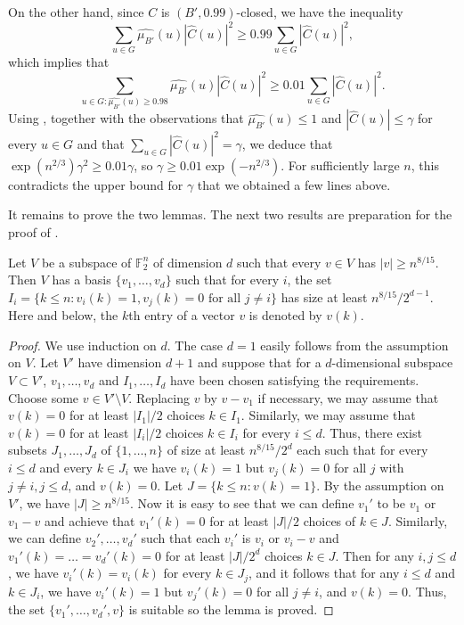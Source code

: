 \documentclass{toc}
\newcommand\g{\gamma}
\newcommand \hC {{\hat C}}
\begin{document}
On the other hand, since $C$ is $(B',0.99)$-closed, we have the inequality
\[\sum_{u\in G} \widehat{\mu_{B'}}(u)|\hC(u)|^2\geq 0.99\sum_{u\in G}|\hC(u)|^2,\]
which implies that 
\[\sum_{u\in G: \widehat{\mu_{B'}}(u)\geq 0.98} \widehat{\mu_{B'}}(u)|\hC(u)|^2\geq 0.01\sum_{u\in G}|\hC(u)|^2.\]
Using , together with the observations that $\widehat{\mu_{B'}}(u)\leq 1$ and $|\hC(u)|\leq \g$ for every $u\in G$ and that $\sum_{u\in G}|\hC(u)|^2=\g$, we deduce that $\exp(n^{2/3})\g^2\geq 0.01 \g$, so $\g\geq 0.01\exp(-n^{2/3})$. For sufficiently large $n$, this contradicts the upper bound for $\g$ that we obtained a few lines above. 
\medskip

It remains to prove the two lemmas. The next two results are preparation for the proof of .

\begin{lemma}\label{Claim2} Let $V$ be a subspace of $\mathbb{F}_2^n$ of dimension $d$ such that every $v\in V$ has $|v|\geq n^{8/15}$. Then $V$ has a basis $\{v_1,\dots,v_d\}$ such that for every $i$, the set $I_i=\{k\leq n: v_i(k)=1,v_j(k)=0 \text{ for all } j\neq i\}$ has size at least $n^{8/15}/2^{d-1}$. Here and below, the $k$th entry of a vector $v$ is denoted by $v(k)$.
\end{lemma}

\begin{proof} We use induction on $d$. The case $d=1$ easily follows from the assumption on $V$. Let $V'$ have dimension $d+1$ and suppose that for a $d$-dimensional subspace $V\subset V'$, $v_1,\dots,v_d$ and $I_1,\dots,I_d$ have been chosen satisfying the requirements. Choose some $v\in V'\setminus V$. Replacing $v$ by $v-v_1$ if necessary, we may assume that $v(k)=0$ for at least $|I_1|/2$ choices $k\in I_1$. Similarly, we may assume that $v(k)=0$ for at least $|I_i|/2$ choices $k\in I_i$ for every $i\leq d$. Thus, there exist subsets $J_1,\dots,J_d$ of $\{1,\dots,n\}$ of size at least $n^{8/15}/2^d$ each such that for every $i\leq d$ and every $k\in J_i$ we have $v_i(k)=1$ but  $v_j(k)=0$ for all $j$ with $j\neq i,j\leq d$, and $v(k)=0$. Let $J=\{k\leq n: v(k)=1\}$. By the assumption on $V'$, we have $|J|\geq n^{8/15}$. Now it is easy to see that we can define $v_1'$ to be $v_1$ or $v_1-v$ and achieve that $v_1'(k)=0$ for at least $|J|/2$ choices of $k\in J$. Similarly, we can define $v_2',\dots,v_d'$ such that each $v_i'$ is $v_i$ or $v_i-v$ and $v_1'(k)=\dots=v_d'(k)=0$ for at least $|J|/2^d$ choices $k\in J$. Then for any $i,j\leq d$, we have $v_i'(k)=v_i(k)$ for every $k\in J_j$, and it follows that for any $i\leq d$ and $k\in J_i$, we have $v_i'(k)=1$ but $v_j'(k)=0$ for all $j\neq i$, and $v(k)=0$. Thus, the set $\{v_1',\dots,v_d',v\}$ is suitable so the lemma is proved.
\end{proof}
\end{document}
